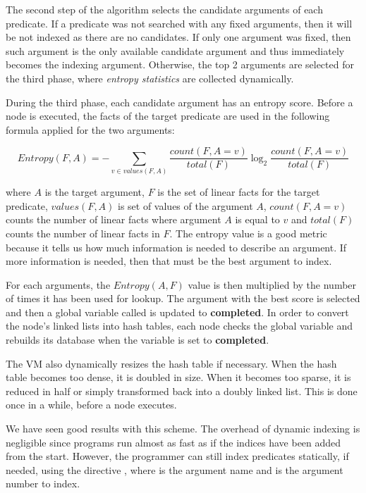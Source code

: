 The second step of the algorithm selects the candidate arguments of each
predicate. If a predicate was not searched with any fixed arguments, then it
will be not indexed as there are no candidates. If only one argument was fixed,
then such argument is the only available candidate argument and thus immediately
becomes the indexing argument. Otherwise, the top 2 arguments are selected for
the third phase, where \emph{entropy statistics} are collected dynamically.

During the third phase, each candidate argument has an entropy score. Before a
node is executed, the facts of the target predicate are used in the following
formula applied for the two arguments:

\[
Entropy(F, A) = - \sum_{v \in values(F, A)} \frac{count(F, A = v)}{total(F)} \log_2 \frac{count(F, A = v)}{total(F)}
\]

\noindent where $A$ is the target argument, $F$ is the set of linear facts for
the target predicate, $values(F, A)$ is set of values of the argument $A$,
$count(F, A = v)$ counts the number of linear facts where argument $A$ is equal
to $v$ and $total(F)$ counts the number of linear facts in $F$.  The entropy
value is a good metric because it tells us how much information is needed to
describe an argument. If more information is needed, then that must be the best
argument to index.

For each arguments, the $Entropy(A, F)$ value is then multiplied by the number
of times it has been used for lookup. The argument with the best score is
selected and then a global variable called  is updated to
\textbf{completed}. In order to convert the node's linked lists into hash
tables, each node checks the global  variable and rebuilds
its database when the variable is set to \textbf{completed}.

The VM also dynamically resizes the hash table if necessary. When the hash table
becomes too dense, it is doubled in size. When it becomes too sparse, it is
reduced in half or simply transformed back into a doubly linked list. This is
done once in a while, before a node executes.

We have seen good results with this scheme. The overhead of dynamic
indexing is negligible since programs run almost as fast as if the indices have
been added from the start. However, the programmer can still index predicates
statically, if needed, using the directive , where
 is the argument name and  is the argument number to index.
